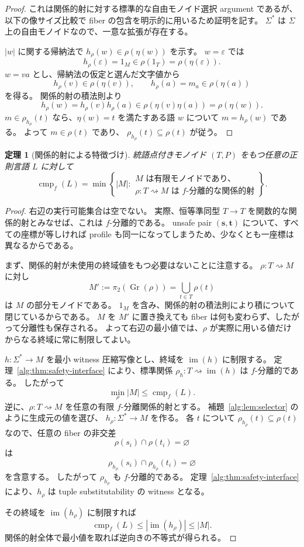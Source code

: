 \documentclass[10pt,a4paper]{ltjsarticle}
\newtheorem{theorem}{定理}[section]
\theoremstyle{definition}
\theoremstyle{remark}
\newcommand{\cmp}{\operatorname{cmp}}
\newcommand{\relto}{\mathrel{\rightsquigarrow}}
\begin{document}
\begin{proof}
これは関係的射に対する標準的な自由モノイド選択 argument であるが、以下の像サイズ比較で fiber の包含を明示的に用いるため証明を記す。
$\Sigma^*$ は $\Sigma$ 上の自由モノイドなので、一意な拡張が存在する。

$|w|$ に関する帰納法で
$h_\rho(w)\in\rho(\eta(w))$
を示す。
$w=\varepsilon$ では
\[
h_\rho(\varepsilon)=1_M
\in\rho(1_T)
=\rho(\eta(\varepsilon)).
\]
$w=va$ とし、帰納法の仮定と選んだ文字値から
\[
h_\rho(v)\in\rho(\eta(v)),
\qquad
h_\rho(a)=m_a\in\rho(\eta(a))
\]
を得る。
関係的射の積法則より
\[
h_\rho(w)
=h_\rho(v)h_\rho(a)
\in\rho(\eta(v)\eta(a))
=\rho(\eta(w)).
\]
$m\in\rho_{h_\rho}(t)$ なら、$\eta(w)=t$ を満たすある語 $w$ について $m=h_\rho(w)$ である。
よって $m\in\rho(t)$ であり、
$\rho_{h_\rho}(t)\subseteq\rho(t)$
が従う。
\end{proof}

\begin{theorem}[関係的射による特徴づけ]
\label{alg:thm:relational-characterization}
統語点付きモノイド $(T,P)$ をもつ任意の正則言語 $L$ に対して
\[
\cmp_f(L)
=
\min\left\{
|M|:
\begin{array}{l}
M\text{ は有限モノイドであり、}\\
\rho:T\relto M\text{ は }f\text{-分離的な関係的射}
\end{array}
\right\}.
\]
\end{theorem}

\begin{proof}
右辺の実行可能集合は空でない。
実際、恒等準同型 $T\to T$ を関数的な関係的射とみなせば、これは $f$-分離的である。
unsafe pair $(\mathbf s,\mathbf t)$ について、すべての座標が等しければ profile も同一になってしまうため、少なくとも一座標は異なるからである。

まず、関係的射が未使用の終域値をもつ必要はないことに注意する。
$\rho:T\relto M$ に対し
\[
M':=\pi_2(\operatorname{Gr}(\rho))
=\bigcup_{t\in T}\rho(t)
\]
は $M$ の部分モノイドである。
$1_M$ を含み、関係的射の積法則により積について閉じているからである。
$M$ を $M'$ に置き換えても fiber は何も変わらず、したがって分離性も保存される。
よって右辺の最小値では、$\rho$ が実際に用いる値だけからなる終域に常に制限してよい。

$h:\Sigma^*\to M$ を最小 witness 圧縮写像とし、終域を $\operatorname{im}(h)$ に制限する。
定理~\ref{alg:thm:safety-interface} により、標準関係
$\rho_h:T\relto\operatorname{im}(h)$
は $f$-分離的である。
したがって
\[
\min_\rho |M|\le\cmp_f(L).
\]
逆に、$\rho:T\relto M$ を任意の有限 $f$-分離関係的射とする。
補題~\ref{alg:lem:selector} のように生成元の値を選び、
$h_\rho:\Sigma^*\to M$
を作る。
各 $t$ について
$\rho_{h_\rho}(t)\subseteq\rho(t)$
なので、任意の fiber の非交差
\[
\rho(s_i)\cap\rho(t_i)=\varnothing
\]
は
\[
\rho_{h_\rho}(s_i)\cap\rho_{h_\rho}(t_i)=\varnothing
\]
を含意する。
したがって $\rho_{h_\rho}$ も $f$-分離的である。
定理~\ref{alg:thm:safety-interface} により、$h_\rho$ は tuple substitutability の witness となる。

その終域を $\operatorname{im}(h_\rho)$ に制限すれば
\[
\cmp_f(L)
\le |\operatorname{im}(h_\rho)|
\le |M|.
\]
関係的射全体で最小値を取れば逆向きの不等式が得られる。
\end{proof}
\end{document}
